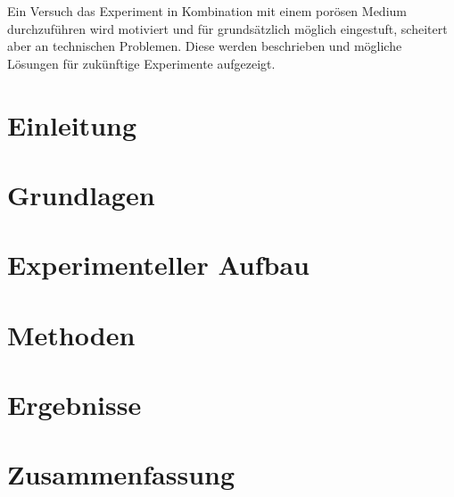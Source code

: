 \documentclass[twoside, a4paper, DIV=11,twocolumn]{book}
\begin{document}
  Ein Versuch das Experiment in Kombination mit einem porösen Medium durchzuführen wird motiviert und für grundsätzlich möglich eingestuft, scheitert aber an technischen Problemen. Diese werden beschrieben und mögliche Lösungen für zukünftige Experimente aufgezeigt.


\twocolumn
\tableofcontents
\listoffigures

\balance %
\chapter{Einleitung}


\chapter{Grundlagen}


\chapter{Experimenteller Aufbau}


\chapter{Methoden}


\chapter{Ergebnisse}


% 

\chapter{Zusammenfassung}


\onecolumn



\end{document}
